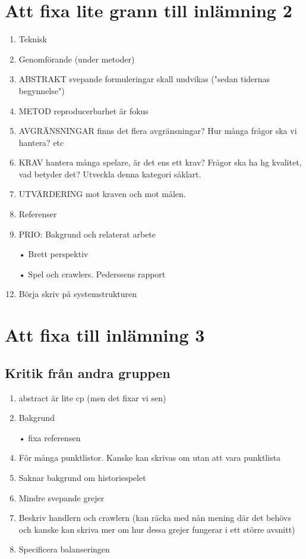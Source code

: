 \documentclass[a4paper,11pt]{article}
\begin{document}
\section{Att fixa lite grann till inlämning 2}

\begin{enumerate}
\item Teknisk 
\item Genomförande (under metoder)
\item ABSTRAKT svepande formuleringar skall undvikas ("sedan tidernas begynnelse")
\item METOD reproducerbarhet är fokus
\item AVGRÄNSNINGAR finns det flera avgränsningar? Hur många frågor ska vi hantera? etc
\item KRAV hantera många spelare, är det ens ett krav? Frågor ska ha hg kvalitet, vad betyder det? Utveckla denna kategori såklart.
\item UTVÄRDERING mot kraven och mot målen.
\item Referenser

\item PRIO: Bakgrund och relaterat arbete
\item[•] Brett perspektiv
\item[•] Spel och crawlers. Pederssens rapport
\item Börja skriv på systemstrukturen
\end{enumerate}

\section{Att fixa till inlämning 3}
\subsection{Kritik från andra gruppen}
\begin{enumerate}
\item abstract är lite cp (men det fixar vi sen)
\item Bakgrund
\item[•] fixa referensen
\item För många punktlistor. Kanske kan skrivas om utan att vara punktlista 
\item Saknar bakgrund om historiespelet
\item Mindre svepande grejer
\item Beskriv handlern och crawlern (kan räcka med nån mening där det behövs och kanske kan skriva mer om hur dessa grejer fungerar i ett större avsnitt)
\item Specificera balanseringen
\end{enumerate}
\end{document}
